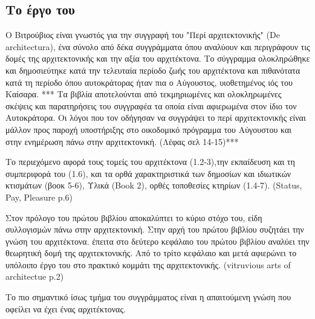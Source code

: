 \subsection{Το έργο του} 

Ο Βιτρούβιος είναι γνωστός για την συγγραφή του "Περί αρχιτεκτονικής" (De 
architectura), ένα σύνολο από δέκα συγγράμματα όπου αναλύουν και περιγράφουν 
τις δομές της αρχιτεκτονικής και την αξία του αρχιτέκτονα.
Το σύγγραμμα ολοκληρώθηκε και δημοσιεύτηκε κατά την τελευταία περίοδο ζωής του 
αρχιτέκτονα και πιθανότατα κατά τη περίοδο όπου αυτοκράτορας ήταν πια ο 
Αύγουστος, υιοθετημένος ιός του Καίσαρα. ***
Τα βιβλία αποτελούνται από τεκμηριωμένες και ολοκληρωμένες σκέψεις και 
παρατηρήσεις του συγγραφέα τα οποία είναι αφιερωμένα στον ίδιο τον Αυτοκράτορα. 
Οι λόγοι που τον οδήγησαν να συγγράψει το περί αρχιτεκτονικής είναι μάλλον προς 
παροχή υποστήριξης στο οικοδομικό πρόγραμμα του Αύγουστου και στην ενημέρωση 
πάνω στην αρχιτεκτονική. (Λέφας σελ 14-15)***

Το περιεχόμενο αφορά τους τομείς του αρχιτέκτονα (1.2-3),την εκπαίδευση και τη 
συμπεριφορά του (1.6), και τα ορθά χαρακτηριστικά των δημοσίων και ιδιωτικών 
κτισμάτων (βοοκ 5-6), Υλικά (Book 2), ορθές τοποθεσίες κτηρίων (1.4-7). 
(Status, Pay, Pleasure p.6)

Στον πρόλογο του πρώτου βιβλίου αποκαλύπτει το κύριο στόχο του, είδη 
συλλογισμών πάνω στην αρχιτεκτονική. Στην αρχή του πρώτου βιβλίου συζητάει την 
γνώση του αρχιτέκτονα. έπειτα στο δεύτερο κεφάλαιο του πρώτου βιβλίου αναλύει 
την θεωρητική δομή της αρχιτεκτονικής. Από το τρίτο κεφάλαιο και μετά αφιερώνει 
το υπόλοιπο έργο του στο πρακτικό κομμάτι της αρχιτεκτονικής. (vitruvious arts 
of architectue p.2)

Το πιο σημαντικό ίσως τμήμα του συγγράμματος είναι η απαιτούμενη γνώση που 
οφείλει να έχει ένας αρχιτέκτονας.